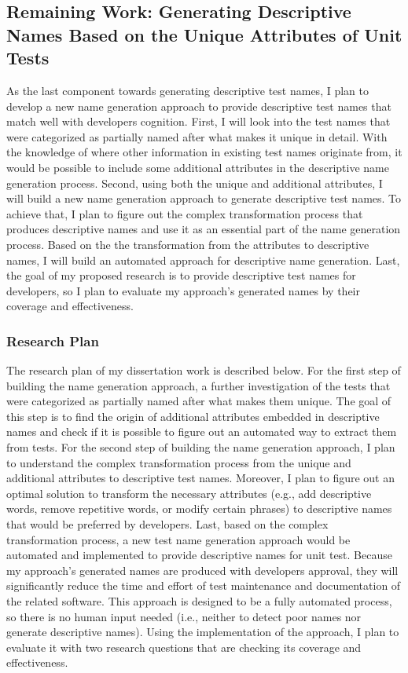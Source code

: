 \subsection{Remaining Work: Generating Descriptive Names Based on the Unique Attributes of Unit Tests}
\label{sec:remaining-work}

As the last component towards generating descriptive test names, I plan to develop a new name generation approach to provide descriptive test names that match well with developers cognition.
%
First, I will look into the test names that were categorized as partially named after what makes it unique in detail.
%
With the knowledge of where other information in existing test names originate from, it would be possible to include some additional attributes in the descriptive name generation process.
%
Second, using both the unique and additional attributes, I will build a new name generation approach to generate descriptive test names.
%
To achieve that, I plan to figure out the complex transformation process that produces descriptive names and use it as an essential part of the name generation process.
%
Based on the the transformation from the attributes to descriptive names, I will build an automated approach for descriptive name generation.
%
Last, the goal of my proposed research is to provide descriptive test names for developers, so I plan to evaluate my approach's generated names by their coverage and effectiveness.


\subsubsection{Research Plan}

The research plan of my dissertation work is described below.
%
For the first step of building the name generation approach, a further investigation of the tests that were categorized as partially named after what makes them unique.
%
The goal of this step is to find the origin of additional attributes embedded in descriptive names and check if it is possible to figure out an automated way to extract them from tests.
%
For the second step of building the name generation approach, I plan to understand the complex transformation process from the unique and additional attributes to descriptive test names.
%
Moreover, I plan to figure out an optimal solution to transform the necessary attributes (e.g., add descriptive words, remove repetitive words, or modify certain phrases) to descriptive names that would be preferred by developers.
%
Last, based on the complex transformation process, a new test name generation approach would be automated and implemented to provide descriptive names for unit test.
%
Because my approach's generated names are produced with developers approval, they will significantly reduce the time and effort of test maintenance and documentation of the related software.
%
This approach is designed to be a fully automated process, so there is no human input needed (i.e., neither to detect poor names nor generate descriptive names).
%
Using the implementation of the approach, I plan to evaluate it with two research questions that are checking its coverage and effectiveness.


